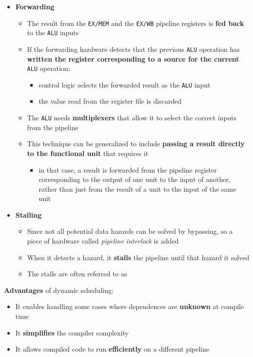 \documentclass[english]{article}
\begin{document}
\begin{itemize}
  \item \textbf{Forwarding}
        \begin{itemize}
          \item The result from the \texttt{EX/MEM} and the \texttt{EX/WB} pipeline registers is \textbf{fed back} to the \texttt{ALU} inputs
          \item If the forwarding hardware detects that the previous \texttt{ALU} operation has \textbf{written the register corresponding to a source for the current} \texttt{ALU} operation:
                \begin{itemize}
                  \item control logic selects the forwarded result as the \texttt{ALU} input
                  \item the value read from the register file is discarded
                \end{itemize}
          \item The \texttt{ALU} needs \textbf{multiplexers} that allow it to select the correct inputs from the pipeline
          \item This technique can be generalized to include \textbf{passing a result directly to the functional unit} that requires it
                \begin{itemize}[label=\(\rightarrow\)]
                  \item in that case, a result is forwarded from the pipeline register corresponding to the output of one unit to the input of another, rather than just from the result of a unit to the input of the same unit
                \end{itemize}
        \end{itemize}
  \item \textbf{Stalling}
        \begin{itemize}
          \item Since not all potential data hazards can be solved by bypassing, so a piece of hardware called \textit{pipeline interlock} is added
          \item When it detects a hazard, it \textbf{stalls} the pipeline until that hazard it solved
          \item The stalls are often referred to as 
        \end{itemize}
\end{itemize}

\bigskip
\textbf{Advantages} of dynamic scheduling:
\begin{itemize}
  \item It enables handling some cases where dependences are \textbf{unknown} at compile time
  \item It \textbf{simplifies} the compiler complexity
  \item It allows compiled code to run \textbf{efficiently} on a different pipeline
\end{itemize}
\end{document}
